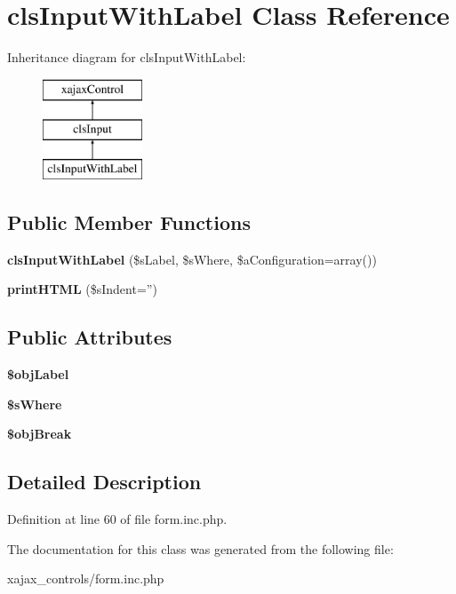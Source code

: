 \hypertarget{classclsInputWithLabel}{
\section{clsInputWithLabel Class Reference}
\label{classclsInputWithLabel}
}
Inheritance diagram for clsInputWithLabel:\begin{figure}[H]
\begin{center}
\leavevmode
\includegraphics[height=3.000000cm]{classclsInputWithLabel}
\end{center}
\end{figure}
\subsection*{Public Member Functions}
\begin{DoxyCompactItemize}
\item 
\hypertarget{classclsInputWithLabel_abfd09670363cbcb8fee625edde801392}{
{\bfseries clsInputWithLabel} (\$sLabel, \$sWhere, \$aConfiguration=array())}
\label{classclsInputWithLabel_abfd09670363cbcb8fee625edde801392}

\item 
\hypertarget{classclsInputWithLabel_a0023f982fc0cb8cb8317812c17c5f9cf}{
{\bfseries printHTML} (\$sIndent='')}
\label{classclsInputWithLabel_a0023f982fc0cb8cb8317812c17c5f9cf}

\end{DoxyCompactItemize}
\subsection*{Public Attributes}
\begin{DoxyCompactItemize}
\item 
\hypertarget{classclsInputWithLabel_ae7301f1c2980344b70925cba5b5c7061}{
{\bfseries \$objLabel}}
\label{classclsInputWithLabel_ae7301f1c2980344b70925cba5b5c7061}

\item 
\hypertarget{classclsInputWithLabel_a661624736de18b2702074f99c0fd01d9}{
{\bfseries \$sWhere}}
\label{classclsInputWithLabel_a661624736de18b2702074f99c0fd01d9}

\item 
\hypertarget{classclsInputWithLabel_a6c5425456baad279bdc5362f7146bcff}{
{\bfseries \$objBreak}}
\label{classclsInputWithLabel_a6c5425456baad279bdc5362f7146bcff}

\end{DoxyCompactItemize}


\subsection{Detailed Description}


Definition at line 60 of file form.inc.php.



The documentation for this class was generated from the following file:\begin{DoxyCompactItemize}
\item 
xajax\_\-controls/form.inc.php\end{DoxyCompactItemize}
